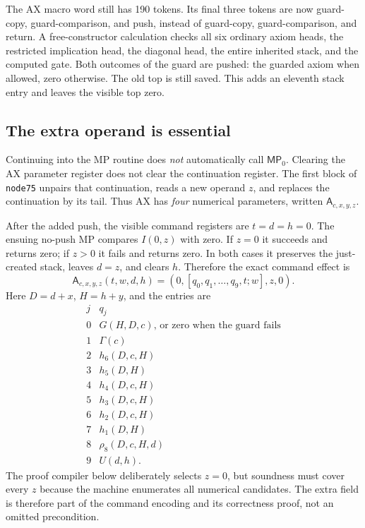 The AX macro word still has 190 tokens. Its final three tokens are
now guard-copy, guard-comparison, and push, instead of guard-copy,
guard-comparison, and return. A free-constructor calculation checks all
six ordinary axiom heads, the restricted implication head, the diagonal
head, the entire inherited stack, and the computed gate. Both outcomes
of the guard are pushed: the guarded axiom when allowed, zero otherwise.
The old top is still saved. This adds an eleventh stack entry and leaves
the visible top zero.

\subsection{The extra operand is essential}

Continuing into the MP routine does \emph{not} automatically call
$\mathsf{MP}_0$. Clearing the AX parameter register does not clear the
continuation register. The first block of \texttt{node75} unpairs that
continuation, reads a new operand $z$, and replaces the continuation by
its tail. Thus AX has \emph{four} numerical parameters, written
$\mathsf A_{c,x,y,z}$.

After the added push, the visible command registers are $t=d=h=0$.
The ensuing no-push MP compares $I(0,z)$ with zero. If $z=0$ it succeeds
and returns zero; if $z>0$ it fails and returns zero. In both cases it
preserves the just-created stack, leaves $d=z$, and clears $h$.
Therefore the exact command effect is
\[
 \mathsf A_{c,x,y,z}(t,w,d,h)
       =(0,[q_0,q_1,\ldots,q_9,t;w],z,0).       \tag{A}
\]
Here $D=d+x$, $H=h+y$, and the entries are
\[
\begin{array}{c|l}
 j&q_j\\\hline
 0&G(H,D,c)\text{, or zero when the guard fails}\\
 1&\Gamma(c)\\
 2&h_6(D,c,H)\\
 3&h_5(D,H)\\
 4&h_4(D,c,H)\\
 5&h_3(D,c,H)\\
 6&h_2(D,c,H)\\
 7&h_1(D,H)\\
 8&\rho_8(D,c,H,d)\\
 9&U(d,h).
\end{array}
\]
The proof compiler below deliberately selects $z=0$, but soundness must
cover every $z$ because the machine enumerates all numerical candidates.
The extra field is therefore part of the command encoding and its
correctness proof, not an omitted precondition.

